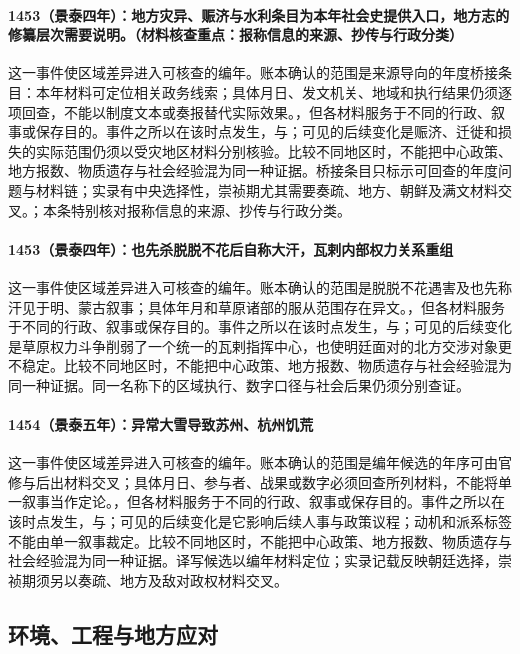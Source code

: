 \paragraph{1453（景泰四年）：地方灾异、赈济与水利条目为本年社会史提供入口，地方志的修纂层次需要说明。（材料核查重点：报称信息的来源、抄传与行政分类）} 这一事件使区域差异进入可核查的编年。账本确认的范围是来源导向的年度桥接条目：本年材料可定位相关政务线索；具体月日、发文机关、地域和执行结果仍须逐项回查，不能以制度文本或奏报替代实际效果。，但各材料服务于不同的行政、叙事或保存目的。事件之所以在该时点发生，与；可见的后续变化是赈济、迁徙和损失的实际范围仍须以受灾地区材料分别核验。比较不同地区时，不能把中心政策、地方报数、物质遗存与社会经验混为同一种证据。桥接条目只标示可回查的年度问题与材料链；实录有中央选择性，崇祯期尤其需要奏疏、地方、朝鲜及满文材料交叉。；本条特别核对报称信息的来源、抄传与行政分类。

\paragraph{1453（景泰四年）：也先杀脱脱不花后自称大汗，瓦剌内部权力关系重组} 这一事件使区域差异进入可核查的编年。账本确认的范围是脱脱不花遇害及也先称汗见于明、蒙古叙事；具体年月和草原诸部的服从范围存在异文。，但各材料服务于不同的行政、叙事或保存目的。事件之所以在该时点发生，与；可见的后续变化是草原权力斗争削弱了一个统一的瓦剌指挥中心，也使明廷面对的北方交涉对象更不稳定。比较不同地区时，不能把中心政策、地方报数、物质遗存与社会经验混为同一种证据。同一名称下的区域执行、数字口径与社会后果仍须分别查证。

\paragraph{1454（景泰五年）：异常大雪导致苏州、杭州饥荒} 这一事件使区域差异进入可核查的编年。账本确认的范围是编年候选的年序可由官修与后出材料交叉；具体月日、参与者、战果或数字必须回查所列材料，不能将单一叙事当作定论。，但各材料服务于不同的行政、叙事或保存目的。事件之所以在该时点发生，与；可见的后续变化是它影响后续人事与政策议程；动机和派系标签不能由单一叙事裁定。比较不同地区时，不能把中心政策、地方报数、物质遗存与社会经验混为同一种证据。译写候选以编年材料定位；实录记载反映朝廷选择，崇祯期须另以奏疏、地方及敌对政权材料交叉。

\subsection{环境、工程与地方应对}

